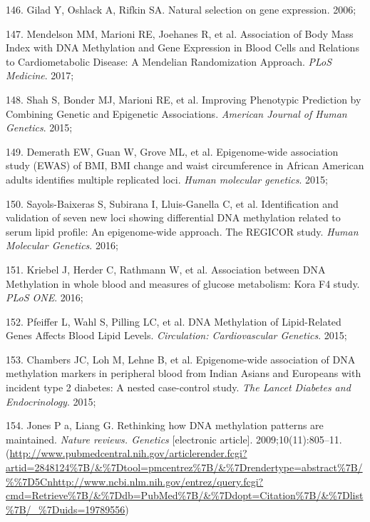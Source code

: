 \documentclass[11pt,oneside]{bristolthesis}
\newenvironment{cslreferences}%
  {}%
  {\par}
\begin{document}
\begin{cslreferences}
\leavevmode\hypertarget{ref-Gilad2006}{}%
146. Gilad Y, Oshlack A, Rifkin SA. Natural selection on gene expression. 2006;

\leavevmode\hypertarget{ref-Mendelson2017}{}%
147. Mendelson MM, Marioni RE, Joehanes R, et al. Association of Body Mass Index with DNA Methylation and Gene Expression in Blood Cells and Relations to Cardiometabolic Disease: A Mendelian Randomization Approach. \emph{PLoS Medicine}. 2017;

\leavevmode\hypertarget{ref-Shah2015}{}%
148. Shah S, Bonder MJ, Marioni RE, et al. Improving Phenotypic Prediction by Combining Genetic and Epigenetic Associations. \emph{American Journal of Human Genetics}. 2015;

\leavevmode\hypertarget{ref-Demerath2015}{}%
149. Demerath EW, Guan W, Grove ML, et al. Epigenome-wide association study (EWAS) of BMI, BMI change and waist circumference in African American adults identifies multiple replicated loci. \emph{Human molecular genetics}. 2015;

\leavevmode\hypertarget{ref-Sayols-Baixeras2016}{}%
150. Sayols-Baixeras S, Subirana I, Lluis-Ganella C, et al. Identification and validation of seven new loci showing differential DNA methylation related to serum lipid profile: An epigenome-wide approach. The REGICOR study. \emph{Human Molecular Genetics}. 2016;

\leavevmode\hypertarget{ref-Kriebel2016}{}%
151. Kriebel J, Herder C, Rathmann W, et al. Association between DNA Methylation in whole blood and measures of glucose metabolism: Kora F4 study. \emph{PLoS ONE}. 2016;

\leavevmode\hypertarget{ref-Pfeiffer2015}{}%
152. Pfeiffer L, Wahl S, Pilling LC, et al. DNA Methylation of Lipid-Related Genes Affects Blood Lipid Levels. \emph{Circulation: Cardiovascular Genetics}. 2015;

\leavevmode\hypertarget{ref-Chambers2015}{}%
153. Chambers JC, Loh M, Lehne B, et al. Epigenome-wide association of DNA methylation markers in peripheral blood from Indian Asians and Europeans with incident type 2 diabetes: A nested case-control study. \emph{The Lancet Diabetes and Endocrinology}. 2015;

\leavevmode\hypertarget{ref-Jones2009}{}%
154. Jones P a, Liang G. Rethinking how DNA methylation patterns are maintained. \emph{Nature reviews. Genetics} {[}electronic article{]}. 2009;10(11):805--11. (\url{http://www.pubmedcentral.nih.gov/articlerender.fcgi?artid=2848124\%7B/\&\%7Dtool=pmcentrez\%7B/\&\%7Drendertype=abstract\%7B/\%\%7D5Cnhttp://www.ncbi.nlm.nih.gov/entrez/query.fcgi?cmd=Retrieve\%7B/\&\%7Ddb=PubMed\%7B/\&\%7Ddopt=Citation\%7B/\&\%7Dlist\%7B/_\%7Duids=19789556})


\end{cslreferences}
\end{document}
